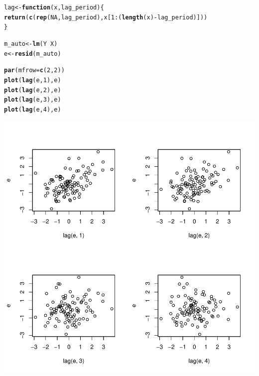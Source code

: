 \documentclass{article}\usepackage[]{graphicx}\usepackage[]{color}
\makeatletter
\def\maxwidth{ %
  \ifdim\Gin@nat@width>\linewidth
    \linewidth
  \else
    \Gin@nat@width
  \fi
}
\newcommand{\hlnum}[1]{\textcolor[rgb]{0.686,0.059,0.569}{#1}}%
\newcommand{\hlopt}[1]{\textcolor[rgb]{0,0,0}{#1}}%
\newcommand{\hlstd}[1]{\textcolor[rgb]{0.345,0.345,0.345}{#1}}%
\newcommand{\hlkwa}[1]{\textcolor[rgb]{0.161,0.373,0.58}{\textbf{#1}}}%
\newcommand{\hlkwb}[1]{\textcolor[rgb]{0.69,0.353,0.396}{#1}}%
\newcommand{\hlkwc}[1]{\textcolor[rgb]{0.333,0.667,0.333}{#1}}%
\newcommand{\hlkwd}[1]{\textcolor[rgb]{0.737,0.353,0.396}{\textbf{#1}}}%
\newenvironment{kframe}{%
 \def\at@end@of@kframe{}%
 \ifinner\ifhmode%
  \def\at@end@of@kframe{\end{minipage}}%
  \begin{minipage}{\columnwidth}%
 \fi\fi%
 \def\FrameCommand##1{\hskip\@totalleftmargin \hskip-\fboxsep
 \colorbox{shadecolor}{##1}\hskip-\fboxsep
     \hskip-\linewidth \hskip-\@totalleftmargin \hskip\columnwidth}%
 \MakeFramed {\advance\hsize-\width
   \@totalleftmargin\z@ \linewidth\hsize
   \@setminipage}}%
 {\par\unskip\endMakeFramed%
 \at@end@of@kframe}
\newenvironment{knitrout}{}{} %
\makeatother
\begin{document}
\begin{knitrout}
\color{fgcolor}\begin{kframe}
\begin{alltt}
\hlstd{lag} \hlkwb{<-} \hlkwa{function}\hlstd{(}\hlkwc{x}\hlstd{,} \hlkwc{lag_period}\hlstd{) \{}
  \hlkwd{return}\hlstd{(}\hlkwd{c}\hlstd{(}\hlkwd{rep}\hlstd{(}\hlnum{NA}\hlstd{, lag_period), x[}\hlnum{1}\hlopt{:}\hlstd{(}\hlkwd{length}\hlstd{(x)} \hlopt{-} \hlstd{lag_period)]))}
\hlstd{\}}

\hlstd{m_auto} \hlkwb{<-} \hlkwd{lm}\hlstd{(Y} \hlopt{~} \hlstd{X)}
\hlstd{e} \hlkwb{<-} \hlkwd{resid}\hlstd{(m_auto)}

\hlkwd{par}\hlstd{(}\hlkwc{mfrow} \hlstd{=} \hlkwd{c}\hlstd{(}\hlnum{2}\hlstd{,} \hlnum{2}\hlstd{))}
\hlkwd{plot}\hlstd{(}\hlkwd{lag}\hlstd{(e,} \hlnum{1}\hlstd{), e)}
\hlkwd{plot}\hlstd{(}\hlkwd{lag}\hlstd{(e,} \hlnum{2}\hlstd{), e)}
\hlkwd{plot}\hlstd{(}\hlkwd{lag}\hlstd{(e,} \hlnum{3}\hlstd{), e)}
\hlkwd{plot}\hlstd{(}\hlkwd{lag}\hlstd{(e,} \hlnum{4}\hlstd{), e)}
\end{alltt}
\end{kframe}
\includegraphics[width=\maxwidth]{figure/unnamed-chunk-11-1} 

\end{knitrout}
\end{document}
